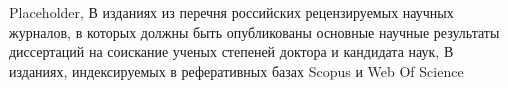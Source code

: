 \geometry{a4paper,top=2cm,bottom=2cm,left=25mm,right=1cm}


\sloppy					%

\makeatletter
\def\bbl@main@language{russian}
\renewcommand{\@biblabel}[1]{#1.}	%
\makeatother

%
  {Placeholder,%
  {\large В изданиях из перечня российских рецензируемых научных %
  журналов, в которых должны быть опубликованы основные научные результаты %
  диссертаций на соискание ученых степеней доктора и кандидата наук},%
  {\large В изданиях, индексируемых в реферативных базах Scopus и Web Of Science}}


\graphicspath{{images/}} %



\tabulinesep=1.2mm

\linespread{1.3}

\setlength{\headheight}{15pt}

\fancyhf{}
\fancyhead[C]{\thepage}
\pagestyle{fancy}
\renewcommand{\headrulewidth}{0pt}


